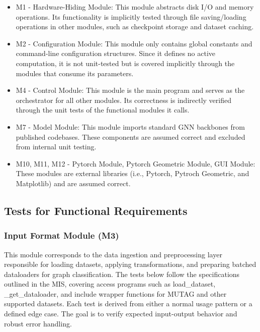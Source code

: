 \documentclass[12pt, titlepage]{article}
\begin{document}
\begin{itemize}
  \item M1 - Hardware-Hiding Module: This module abstracts disk I/O and memory operations. Its functionality is implicitly tested through file saving/loading operations in other modules, such as checkpoint storage and dataset caching.
  
  \item M2 - Configuration Module: This module only contains global constants and command-line configuration structures. Since it defines no active computation, it is not unit-tested but is covered implicitly through the modules that consume its parameters.
  
  \item M4 - Control Module: This module is the main program and serves as the orchestrator for all other modules. Its correctness is indirectly verified through the unit tests of the functional modules it calls.
  
  \item M7 - Model Module: This module imports standard GNN backbones from published codebases. These components are assumed correct and excluded from internal unit testing.
  \item M10, M11, M12 - Pytorch Module, Pytorch Geometric Module, GUI Module: These modules are external libraries (i.e., Pytorch, Pytroch Geometric, and Matplotlib) and are assumed correct.
\end{itemize}




\subsection{Tests for Functional Requirements}
\label{sub:unit FR}

\subsubsection{Input Format Module (M3)}

This module corresponds to the data ingestion and preprocessing layer responsible for loading datasets, applying transformations, and preparing batched dataloaders for graph classification. The tests below follow the specifications outlined in the MIS, covering access programs such as load\_dataset, \_get\_dataloader, and include wrapper functions for MUTAG and other supported datasets. Each test is derived from either a normal usage pattern or a defined edge case. The goal is to verify expected input-output behavior and robust error handling.
\end{document}
